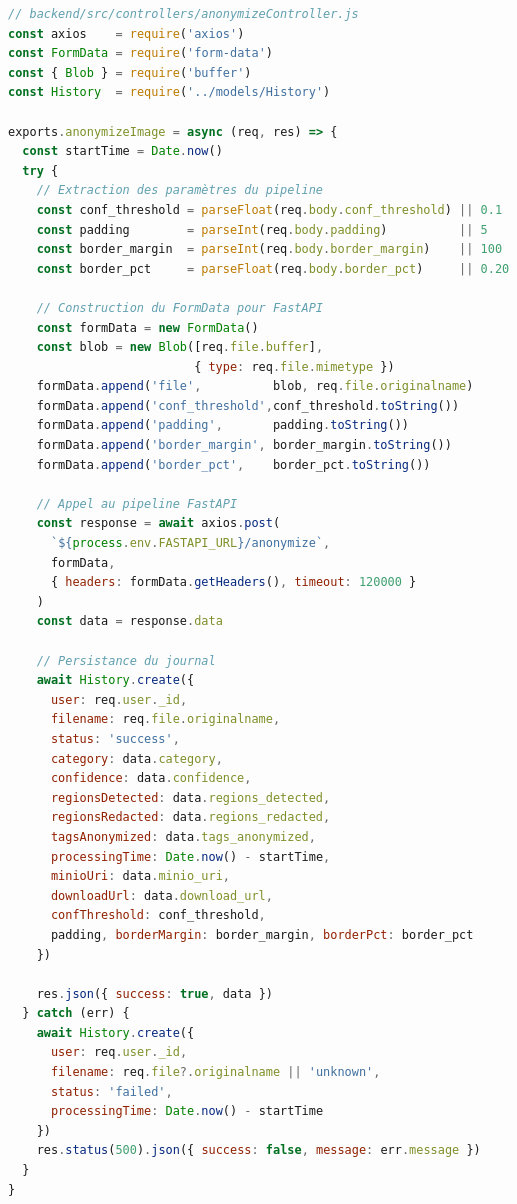 \begin{lstlisting}[language=JavaScript, caption={Contrôleur d'anonymisation -- transmission au pipeline IA}, label={lst:anon_ctrl}]
// backend/src/controllers/anonymizeController.js
const axios    = require('axios')
const FormData = require('form-data')
const { Blob } = require('buffer')
const History  = require('../models/History')

exports.anonymizeImage = async (req, res) => {
  const startTime = Date.now()
  try {
    // Extraction des paramètres du pipeline
    const conf_threshold = parseFloat(req.body.conf_threshold) || 0.1
    const padding        = parseInt(req.body.padding)          || 5
    const border_margin  = parseInt(req.body.border_margin)    || 100
    const border_pct     = parseFloat(req.body.border_pct)     || 0.20

    // Construction du FormData pour FastAPI
    const formData = new FormData()
    const blob = new Blob([req.file.buffer],
                          { type: req.file.mimetype })
    formData.append('file',          blob, req.file.originalname)
    formData.append('conf_threshold',conf_threshold.toString())
    formData.append('padding',       padding.toString())
    formData.append('border_margin', border_margin.toString())
    formData.append('border_pct',    border_pct.toString())

    // Appel au pipeline FastAPI
    const response = await axios.post(
      `${process.env.FASTAPI_URL}/anonymize`,
      formData,
      { headers: formData.getHeaders(), timeout: 120000 }
    )
    const data = response.data

    // Persistance du journal
    await History.create({
      user: req.user._id,
      filename: req.file.originalname,
      status: 'success',
      category: data.category,
      confidence: data.confidence,
      regionsDetected: data.regions_detected,
      regionsRedacted: data.regions_redacted,
      tagsAnonymized: data.tags_anonymized,
      processingTime: Date.now() - startTime,
      minioUri: data.minio_uri,
      downloadUrl: data.download_url,
      confThreshold: conf_threshold,
      padding, borderMargin: border_margin, borderPct: border_pct
    })

    res.json({ success: true, data })
  } catch (err) {
    await History.create({
      user: req.user._id,
      filename: req.file?.originalname || 'unknown',
      status: 'failed',
      processingTime: Date.now() - startTime
    })
    res.status(500).json({ success: false, message: err.message })
  }
}
\end{lstlisting}

